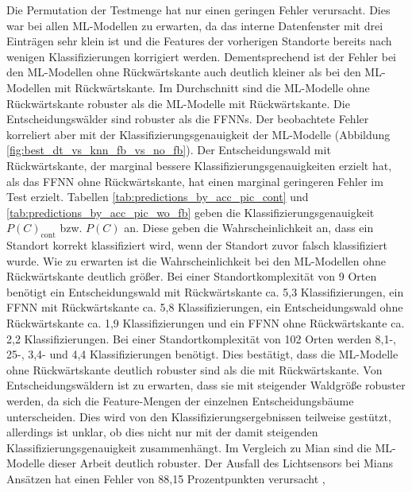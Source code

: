 \newline
Die Permutation der Testmenge hat nur einen geringen Fehler verursacht.
Dies war bei allen ML-Modellen zu erwarten, da das interne Datenfenster mit drei Einträgen sehr klein ist
und die Features der vorherigen Standorte bereits nach wenigen Klassifizierungen korrigiert werden.
Dementsprechend ist der Fehler bei den ML-Modellen ohne Rückwärtskante auch deutlich kleiner als bei den ML-Modellen mit Rückwärtskante.
\newpage
Im Durchschnitt sind die ML-Modelle ohne Rückwärtskante robuster als die ML-Modelle mit Rückwärtskante.
Die Entscheidungswälder sind robuster als die FFNNs.
Der beobachtete Fehler korreliert aber mit der Klassifizierungsgenauigkeit der ML-Modelle (Abbildung \ref{fig:best_dt_vs_knn_fb_vs_no_fb}).
Der Entscheidungswald mit Rückwärtskante, der marginal bessere Klassifizierungsgenauigkeiten erzielt hat, als das FFNN ohne Rückwärtskante,
hat einen marginal geringeren Fehler im Test erzielt.
\newline
\newline
Tabellen \ref{tab:predictions_by_acc_pic_cont} und \ref{tab:predictions_by_acc_pic_wo_fb} geben die Klassifizierungsgenauigkeit $P(C)_{\text{cont}}$ bzw. $P(C)$ an.
Diese geben die Wahrscheinlichkeit an, dass ein Standort korrekt klassifiziert wird, wenn der Standort zuvor falsch klassifiziert wurde.
Wie zu erwarten ist die Wahrscheinlichkeit bei den ML-Modellen ohne Rückwärtskante deutlich größer.
Bei einer Standortkomplexität von 9 Orten benötigt ein Entscheidungswald mit Rückwärtskante ca. 5,3 Klassifizierungen,
ein FFNN mit Rückwärtskante ca. 5,8 Klassifizierungen, ein Entscheidungswald ohne Rückwärtskante ca. 1,9 Klassifizierungen
und ein FFNN ohne Rückwärtskante ca. 2,2 Klassifizierungen.
Bei einer Standortkomplexität von 102 Orten werden 8,1-, 25-, 3,4- und 4,4 Klassifizierungen benötigt.
Dies bestätigt, dass die ML-Modelle ohne Rückwärtskante deutlich robuster sind als die mit Rückwärtskante.
\newline
\newline
Von Entscheidungswäldern ist zu erwarten, dass sie mit steigender Waldgröße robuster werden, da sich die Feature-Mengen der einzelnen Entscheidungsbäume unterscheiden.
Dies wird von den Klassifizierungsergebnissen teilweise gestützt, allerdings ist unklar, ob dies nicht nur mit der damit steigenden Klassifizierungsgenauigkeit zusammenhängt.
\newline
\newline
Im Vergleich zu Mian sind die ML-Modelle dieser Arbeit deutlich robuster.
Der Ausfall des Lichtsensors bei Mians Ansätzen hat einen Fehler von 88,15 Prozentpunkten verursacht \cite{naveedThesis},
